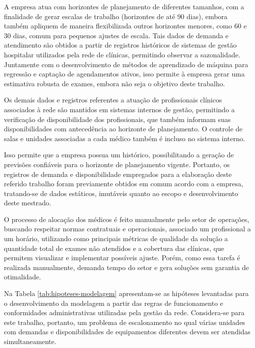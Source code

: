A empresa atua com horizontes de planejamento de diferentes tamanhos, com a finalidade de gerar escalas de trabalho (horizontes de até 90 dias), embora também apliquem de maneira flexibilizada outros horizontes menores, como 60 e 30 dias, comum para pequenos ajustes de escala. Tais dados de demanda e atendimento são obtidos a partir de registros históricos de sistemas de gestão hospitalar utilizados pela rede de clínicas, permitindo observar a sazonalidade. Juntamente com o desenvolvimento de métodos de aprendizado de máquina para regressão e captação de agendamentos ativos, isso permite à empresa gerar uma estimativa robusta de exames, embora não seja o objetivo deste trabalho.

Os demais dados e registros referentes a atuação de profissionais clínicos associados à rede são mantidos em sistemas internos de gestão, permitindo a verificação de disponibilidade dos profissionais, que também informam suas disponibilidades com antecedência ao horizonte de planejamento. O controle de salas e unidades associadas a cada médico também é incluso no sistema interno.

Isso permite que a empresa possua um histórico, possibilitando a geração de previsões confiáveis para o horizonte de planejamento vigente. Portanto, os registros de demanda e disponibilidade empregados para a elaboração deste referido trabalho foram previamente obtidos em comum acordo com a empresa, tratando-se de dados estáticos, imutáveis quanto ao escopo e desenvolvimento deste mestrado.

O processo de alocação dos médicos é feito manualmente pelo setor  de operações, buscando respeitar normas contratuais e operacionais, associado um profissional a um horário, utilizando como principais métricas de qualidade da solução a quantidade total de exames não atendidos e a cobertura das clínicas, que permitem visualizar e implementar possíveis ajuste. Porém, como essa tarefa é realizada manualmente, demanda tempo do setor e gera soluções sem garantia de otimalidade.

Na Tabela \ref{tab:hipoteses-modelagem} apresentam-se as hipóteses levantadas para o desenvolvimento da modelagem a partir das regras de funcionamento e conformidades administrativas utilizadas pela gestão da rede. Considera-se para este trabalho, portanto, um problema de escalonamento no qual várias unidades com demandas e disponibilidades de equipamentos diferentes devem ser atendidas simultaneamente.

